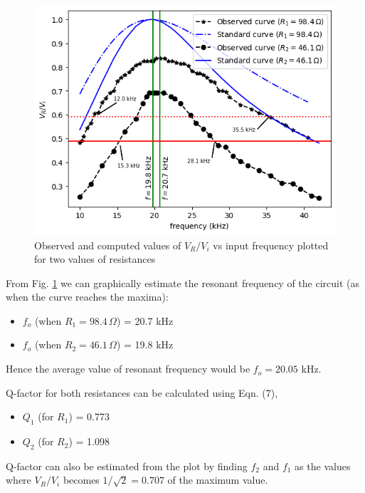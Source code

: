         \begin{figure}[H]
            \centering
            \includegraphics[width=1\columnwidth]{images/g2.png}
            \caption{Observed and computed values of $V_R/V_i$ vs input frequency plotted for two values of resistances}
            \label{graph:1}
        \end{figure}

        From Fig. \ref{graph:1} we can graphically estimate the resonant frequency of the circuit (as when the curve reaches the maxima):

        \begin{itemize}
            \item $f_o$ (when $R_1=98.4\,\Omega$) = 20.7 kHz
            \item $f_o$ (when $R_2=46.1\,\Omega$) = 19.8 kHz
        \end{itemize}

        Hence the average value of resonant frequency would be $f_o=20.05$ kHz.

        Q-factor for both resistances can be calculated using Eqn. (7), 

        \begin{itemize}
            \item $Q_1$ (for $R_1$) = 0.773
            \item $Q_2$ (for $R_2$) = 1.098
        \end{itemize}

        Q-factor can also be estimated from the plot by finding $f_2$ and $f_1$ as the values where $V_R/V_i$ becomes $1/\sqrt{2}=0.707$ of the maximum value.
        
